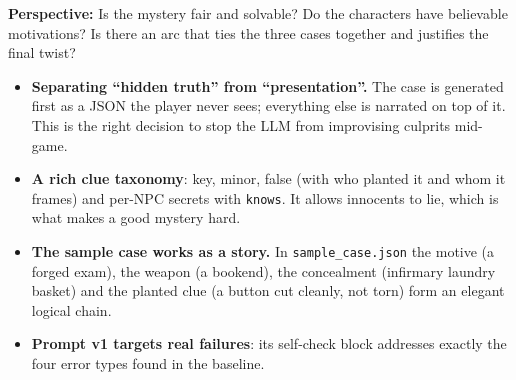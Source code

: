 \documentclass[11pt,a4paper]{article}
\newcommand{\file}[1]{\texttt{\small #1}}
\begin{document}
\begin{perfil}
\textbf{Perspective:} Is the mystery fair and solvable? Do the characters have believable
motivations? Is there an arc that ties the three cases together and justifies the final twist?
\end{perfil}

\begin{fuerte}
\begin{itemize}
\item \textbf{Separating ``hidden truth'' from ``presentation''.} The case is generated first as a
JSON the player never sees; everything else is narrated on top of it. This is the right decision to
stop the LLM from improvising culprits mid-game.
\item \textbf{A rich clue taxonomy}: key, minor, false (with who planted it and whom it frames) and
per-NPC secrets with \texttt{knows}. It allows innocents to lie, which is what makes a good mystery
hard.
\item \textbf{The sample case works as a story.} In \file{sample\_case.json} the motive (a forged
exam), the weapon (a bookend), the concealment (infirmary laundry basket) and the planted clue (a
button cut cleanly, not torn) form an elegant logical chain.
\item \textbf{Prompt v1 targets real failures}: its self-check block addresses exactly the four error
types found in the baseline.
\end{itemize}
\end{fuerte}
\end{document}
